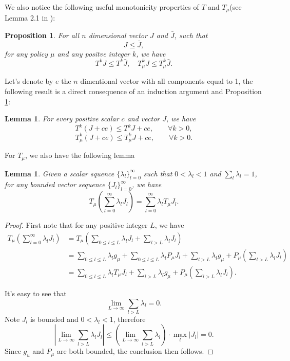 \documentclass[12pt,a4paper]{amsart}
\numberwithin{equation}{section}
\theoremstyle{plain}
\newtheorem{Lemma}[Th]{Lemma}
\newtheorem{Prop}[Th]{Proposition}
\theoremstyle{definition}
\begin{document}
We also notice the following useful monotonicity properties of $T$ and $T_{\mu}$(see Lemma 2.1 in \cite{BertsekasTsitsiklis96}):
\begin{Prop} \label{mon}
	For all $n$ dimensional vector $J$ and $\bar{J}$, such that
	$$
	J \leq \bar{J},
	$$
	for any  policy $\mu$ and any positve integer $k$, we have
	$$
	T^k J \leq T^k \bar{J}, \quad T_{\mu}^k J \leq T_{\mu}^k \bar{J}.
	$$
\end{Prop}
Let's denote by $e$ the $n$ dimentional vector with all components equal to 1, the following result is a direct consequence of an induction argument and Proposition \ref{mon}:
\begin{Lemma} \label{lmmon}
	For every positive scalar $c$ and vector $J$, we have 
	$$
	T^{k} (J + ce) \leq T^k J + ce, \quad  \quad \forall k > 0,
	$$
	$$
	T_{\mu}^{k} (J + ce) \leq T_{\mu}^k J + ce, \quad  \quad \forall k > 0.
	$$
\end{Lemma}
For $T_{\mu}$, we also have the following lemma
\begin{Lemma} \label{lmtmu}
	Given a scalar squence $\{\lambda_{l} \}_{l=0}^{\infty}$ such that $ 0 < \lambda_l < 1$ and $\sum_{l} \lambda_l = 1$, for any bounded vector sequence $\{J_l\}_{l=0}^{\infty}$, we have
	$$
	T_{\mu} \left(\sum_{l=0}^{\infty} \lambda_l J_l\right) = \sum_{l=0}^{\infty} \lambda_l T_{\mu} J_l.
	$$
\end{Lemma}
\begin{proof}
	First note that for any positive integer $L$, we have
	$$
	\begin{aligned}
	T_{\mu} \left(\sum_{l=0}^{\infty} \lambda_l J_l \right) & = T_{\mu} \left( \sum_{ 0 \le l \le L} \lambda_l J_l + \sum_{l >L} \lambda_l J_l \right) \\
	& = \sum_{0 \le l \le L} \lambda_l g_{\mu} + \sum_{0 \le l \le L} \lambda_l P_{\mu} J_l +  \sum_{l > L} \lambda_l g_{\mu} + P_{\mu} \left( \sum_{l > L} \lambda_l J_l \right) \\
	& = \sum_{ 0 \le l \le L} \lambda_l T_{\mu} J_l + \sum_{l > L} \lambda_l g_{\mu} + P_{\mu} \left( \sum_{l > L} \lambda_l J_l \right) .
	\end{aligned}
	$$
	
	It's easy to see that 
	$$ 
	\lim_{L \to \infty}\sum_{l > L}\lambda_{l} = 0. 
	$$
	Note $J_l$ is bounded and $ 0 < \lambda_{l} < 1$, therefore
	$$
	\left| \lim_{L\to \infty} \sum_{l > L} \lambda_l J_l  \right|  \le  \left( \lim_{L \to \infty} \sum_{l > L} \lambda_{l} \right) \cdot \max_{l} \left|J_l\right|   = 0.
	$$
	Since $g_u$ and $P_{\mu}$ are both bounded, the conclusion then follows. 
\end{proof}
\end{document}
